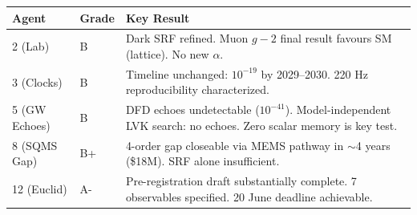 \documentclass[11pt,a4paper]{article}
\begin{document}
\begin{center}
\begin{tabular}{llp{8cm}}
\toprule
\textbf{Agent} & \textbf{Grade} & \textbf{Key Result} \\
\midrule
2 (Lab) & B & Dark SRF refined. Muon $g-2$ final result favours SM (lattice). No new $\alpha$. \\
3 (Clocks) & B & Timeline unchanged: $10^{-19}$ by 2029--2030. 220 Hz reproducibility characterized. \\
5 (GW Echoes) & B & DFD echoes undetectable ($10^{-41}$). Model-independent LVK search: no echoes. Zero scalar memory is key test. \\
8 (SQMS Gap) & B+ & 4-order gap closeable via MEMS pathway in $\sim$4 years (\$18M). SRF alone insufficient. \\
12 (Euclid) & A- & Pre-registration draft substantially complete. 7 observables specified. 20 June deadline achievable. \\
\bottomrule
\end{tabular}
\end{center}
\end{document}
